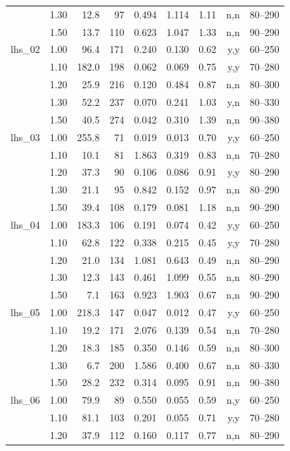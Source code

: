 \begin{longtable}{@{}l r r r r r r r r@{}}
 & 1.30 & 12.8 & 97 & 0.494 & 1.114 & 1.11 & n,n & 80--290 \\
 & 1.50 & 13.7 & 110 & 0.623 & 1.047 & 1.33 & n,n & 90--290 \\
\addlinespace
lhs\_02 & 1.00 & 96.4 & 171 & 0.240 & 0.130 & 0.62 & y,y & 60--250 \\
 & 1.10 & 182.0 & 198 & 0.062 & 0.069 & 0.75 & y,y & 70--280 \\
 & 1.20 & 25.9 & 216 & 0.120 & 0.484 & 0.87 & n,n & 80--300 \\
 & 1.30 & 52.2 & 237 & 0.070 & 0.241 & 1.03 & y,n & 80--330 \\
 & 1.50 & 40.5 & 274 & 0.042 & 0.310 & 1.39 & n,n & 90--380 \\
\addlinespace
lhs\_03 & 1.00 & 255.8 & 71 & 0.019 & 0.013 & 0.70 & y,y & 60--250 \\
 & 1.10 & 10.1 & 81 & 1.863 & 0.319 & 0.83 & n,n & 70--280 \\
 & 1.20 & 37.3 & 90 & 0.106 & 0.086 & 0.91 & y,y & 80--290 \\
 & 1.30 & 21.1 & 95 & 0.842 & 0.152 & 0.97 & n,n & 80--290 \\
 & 1.50 & 39.4 & 108 & 0.179 & 0.081 & 1.18 & n,n & 90--290 \\
\addlinespace
lhs\_04 & 1.00 & 183.3 & 106 & 0.191 & 0.074 & 0.42 & y,y & 60--250 \\
 & 1.10 & 62.8 & 122 & 0.338 & 0.215 & 0.45 & y,y & 70--280 \\
 & 1.20 & 21.0 & 134 & 1.081 & 0.643 & 0.49 & n,n & 80--290 \\
 & 1.30 & 12.3 & 143 & 0.461 & 1.099 & 0.55 & n,n & 80--290 \\
 & 1.50 & 7.1 & 163 & 0.923 & 1.903 & 0.67 & n,n & 90--290 \\
\addlinespace
lhs\_05 & 1.00 & 218.3 & 147 & 0.047 & 0.012 & 0.47 & y,y & 60--250 \\
 & 1.10 & 19.2 & 171 & 2.076 & 0.139 & 0.54 & n,n & 70--280 \\
 & 1.20 & 18.3 & 185 & 0.350 & 0.146 & 0.59 & n,n & 80--300 \\
 & 1.30 & 6.7 & 200 & 1.586 & 0.400 & 0.67 & n,n & 80--330 \\
 & 1.50 & 28.2 & 232 & 0.314 & 0.095 & 0.91 & n,n & 90--380 \\
\addlinespace
lhs\_06 & 1.00 & 79.9 & 89 & 0.550 & 0.055 & 0.59 & n,y & 60--250 \\
 & 1.10 & 81.1 & 103 & 0.201 & 0.055 & 0.71 & y,y & 70--280 \\
 & 1.20 & 37.9 & 112 & 0.160 & 0.117 & 0.77 & n,n & 80--290 \\

\end{longtable}
